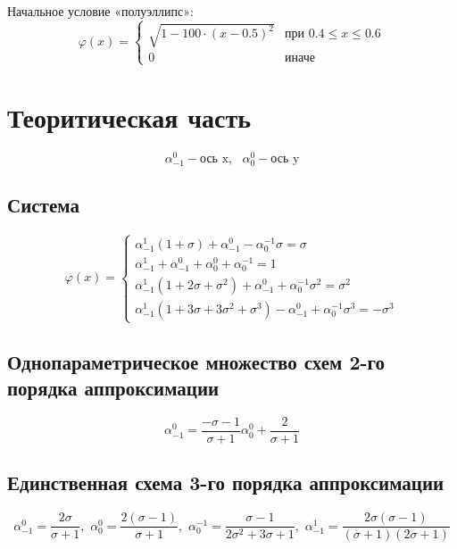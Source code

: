 \documentclass[a4paper, 12pt]{article} %
\begin{document}
Начальное условие «полуэллипс»:
\begin{equation*}
\varphi(x) = 
 \begin{cases}
   \sqrt{1 - 100 \cdot \left( x - 0.5 \right)^2} &\text{при $0.4 \leqslant x \leqslant 0.6$}\\
   0 &\text{иначе}
\end{cases}
\end{equation*}


\section{Теоритическая часть}
$$\alpha^{0}_{-1} - \text{ось x}, \,\,\,\, \alpha^{0}_{0} - \text{ось y}$$

\subsection{Система}
\begin{equation*}
\varphi(x) = 
 \begin{cases}
 	\alpha^{1}_{-1}\left(1 + \sigma \right) + \alpha^{0}_{-1} - \alpha^{-1}_{0} \sigma = \sigma  \\  
 	\alpha^{1}_{-1} + \alpha^{0}_{-1} + \alpha^{0}_{0} + \alpha^{-1}_{0}  = 1 \\
 	\alpha^{1}_{-1} \left( 1 + 2\sigma + \sigma^2 \right) + \alpha^{0}_{-1} + \alpha^{-1}_{0}\sigma^2 = \sigma^2 \\
 	\alpha^{1}_{-1} \left( 1 + 3\sigma + 3\sigma^2 + \sigma^3 \right) - \alpha^{0}_{-1} + \alpha^{-1}_{0}\sigma^3 = -\sigma^3 
 \end{cases}
\end{equation*}


\subsection{Однопараметрическое множество схем 2-го порядка аппроксимации}
\label{subsec:2t}
$$\alpha^{0}_{-1} = \frac{-\sigma-1}{\sigma+1} \alpha^{0}_{0}+ \frac{2}{\sigma+1}$$

\subsection{Единственная схема 3-го порядка аппроксимации}
\label{subsec:3t}
$$\alpha^{0}_{-1} = \frac{2\sigma}{\sigma + 1},\,\, 
  \alpha^{0}_{0} = \frac{2(\sigma - 1)}{\sigma + 1}, \,\,
  \alpha^{-1}_{0} = \frac{\sigma - 1}{2\sigma^2 + 3\sigma + 1},\,\,
  \alpha^{1}_{-1} = \frac{2\sigma(\sigma-1)}{(\sigma+1)(2\sigma + 1)}$$
\end{document}
